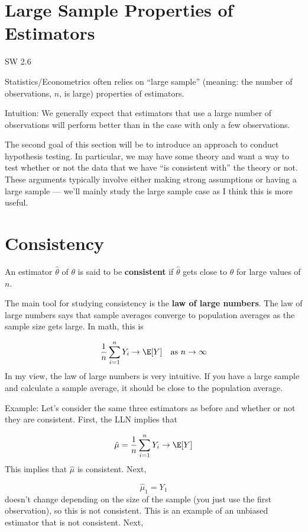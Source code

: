 \documentclass[
  letterpaper,
  DIV=11,
  numbers=noendperiod]{scrreprt}
\begin{document}
\section{Large Sample Properties of
Estimators}\label{large-sample-properties-of-estimators}

SW 2.6

Statistics/Econometrics often relies on ``large sample'' (meaning: the
number of observations, \(n\), is large) properties of estimators.

Intuition: We generally expect that estimators that use a large number
of observations will perform better than in the case with only a few
observations.

The second goal of this section will be to introduce an approach to
conduct hypothesis testing. In particular, we may have some theory and
want a way to test whether or not the data that we have ``is consistent
with'' the theory or not. These arguments typically involve either
making strong assumptions or having a large sample --- we'll mainly
study the large sample case as I think this is more useful.

\section{Consistency}\label{consistency}

An estimator \(\hat{\theta}\) of \(\theta\) is said to be
\textbf{consistent} if \(\hat{\theta}\) gets close to \(\theta\) for
large values of \(n\).

The main tool for studying consistency is the \textbf{law of large
numbers}. The law of large numbers says that sample averages converge to
population averages as the sample size gets large. In math, this is

\[
  \frac{1}{n} \sum_{i=1}^n Y_i \rightarrow \E[Y] \quad \textrm{as } n \rightarrow \infty
\] In my view, the law of large numbers is very intuitive. If you have a
large sample and calculate a sample average, it should be close to the
population average.

{Example: }Let's consider the same three estimators as before and
whether or not they are consistent. First, the LLN implies that

\[
  \hat{\mu} = \frac{1}{n} \sum_{i=1}^n Y_i \rightarrow \E[Y]
\] This implies that \(\hat{\mu}\) is consistent. Next,

\[
  \hat{\mu}_1 = Y_1
\] doesn't change depending on the size of the sample (you just use the
first observation), so this is not consistent. This is an example of an
unbiased estimator that is not consistent. Next,
\end{document}
